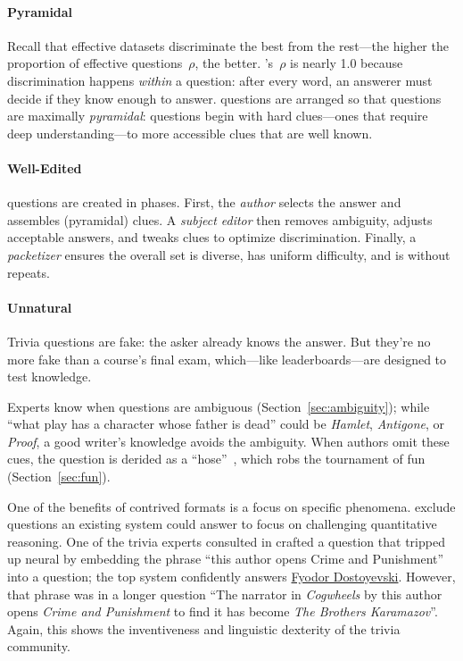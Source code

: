 \paragraph{Pyramidal}
\label{sec:pyramidality}

Recall that effective datasets discriminate the best
from the rest---the higher the proportion of effective
questions~$\rho$, the better.
\qb{}'s~$\rho$ is nearly 1.0 because discrimination happens
\emph{within} a question: after every word, an answerer must decide
if they know enough to answer.
\qb{} questions are arranged so that questions are maximally \emph{pyramidal}: questions begin with hard clues---ones that require deep understanding---to more accessible clues that are well known.


\paragraph{Well-Edited}

\qb{} questions are created in phases.
First, the \emph{author} selects the answer and assembles (pyramidal) clues.
A \emph{subject editor} then removes ambiguity, adjusts acceptable answers, and tweaks clues to optimize discrimination.
Finally, a \emph{packetizer} ensures the overall set is diverse, has uniform difficulty, and is without repeats.

\paragraph{Unnatural}
\label{sec:unnatural}

Trivia questions are fake: the asker already knows the answer.  
But they're no more fake than a course's final exam, which---like leaderboards---are designed to test knowledge.

Experts know when questions are ambiguous (Section~\ref{sec:ambiguity}); while ``what play has a character whose father is dead'' could be \textit{Hamlet}, \textit{Antigone}, or \textit{Proof}, a good writer's knowledge avoids the ambiguity.
When authors omit these cues, the question is derided as a ``hose''~\cite{2013-eltinge}, which robs the tournament of fun (Section~\ref{sec:fun}).

One of the benefits of contrived formats is a focus on specific phenomena. 
 exclude questions an existing  system could answer to focus on challenging quantitative reasoning.
One of the trivia experts consulted in  crafted a question that tripped up neural  by embedding the phrase ``this author opens Crime and Punishment'' into a question; the top system confidently answers \underline{Fyodor Dostoyevski}.
However, that phrase was in a longer question ``The narrator in \textit{Cogwheels} by this author opens \textit{Crime and Punishment} to find it has become \textit{The Brothers Karamazov}''. 
Again, this shows the inventiveness and linguistic dexterity of the trivia community.


